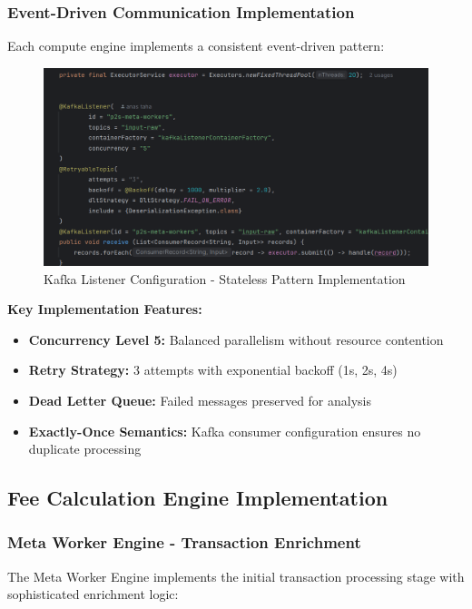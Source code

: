 \subsubsection{Event-Driven Communication Implementation}

Each compute engine implements a consistent event-driven pattern:

\begin{figure}[h]
    \centering
    \includegraphics[width=1\textwidth]{img/impl/kafka listener.png}
    \caption{Kafka Listener Configuration - Stateless Pattern Implementation}
    \label{fig:kafka-listener-impl}
\end{figure}

\textbf{Key Implementation Features:}
\begin{itemize}
    \item \textbf{Concurrency Level 5:} Balanced parallelism without resource contention
    \item \textbf{Retry Strategy:} 3 attempts with exponential backoff (1s, 2s, 4s)
    \item \textbf{Dead Letter Queue:} Failed messages preserved for analysis
    \item \textbf{Exactly-Once Semantics:} Kafka consumer configuration ensures no duplicate processing
\end{itemize}

\subsection{Fee Calculation Engine Implementation}

\subsubsection{Meta Worker Engine - Transaction Enrichment}

The Meta Worker Engine implements the initial transaction processing stage with sophisticated enrichment logic:


